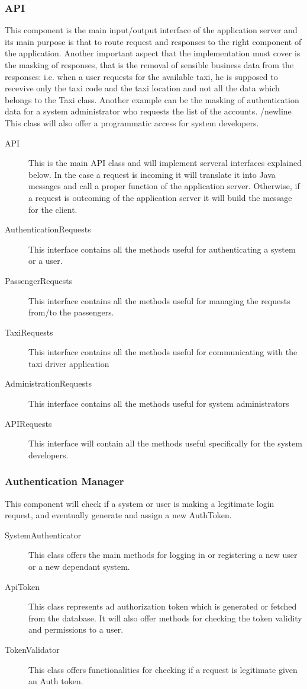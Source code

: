 \documentclass[11pt, a4paper,titlepage]{article}
\begin{document}
 \subsubsection{API}
	 This component is the main input/output interface of the application server and its main purpose is that to route request and responses to the right component of the application. Another important aspect that the implementation must cover is the masking of responses, that is the removal of sensible business data from the responses: i.e. when a user requests for the available taxi, he is supposed to recevive only the taxi code and the taxi location and not all the data which belongs to the Taxi class. Another example can be the masking of authentication data for a system administrator who requests the list of the accounts.
	 /newline This class will also offer a programmatic access for system developers. 
	 \begin{description}
	 	\item[API] This is the main API class and will implement serveral interfaces explained below. In the case a request is incoming it will translate it into Java messages and call a proper function of the application server. Otherwise, if a request is outcoming of the application server it will build the message for the client.
	 	\item[AuthenticationRequests] This interface contains all the methods useful for authenticating a system or a user.
	 	\item[PassengerRequests] This interface contains all the methods useful for managing the requests from/to the passengers. 
	 	\item[TaxiRequests] This interface contains all the methods useful for communicating with the taxi driver application
	 	\item[AdministrationRequests] This interface contains all the methods useful for system administrators
	 	\item[APIRequests] This interface will contain all the methods useful specifically for the system developers.
	 \end{description}
 \subsubsection{Authentication Manager}
	 This component will check if a system or user is making a legitimate login request, and eventually generate and assign a new AuthToken.
	 \begin{description}
	 	\item[SystemAuthenticator] This class offers the main methods for logging in or registering a new user or a new dependant system.
	 	\item[ApiToken] This class represents ad authorization token which is generated or fetched from the database. It will also offer methods for checking the token validity and permissions to a user.
	 	\item[TokenValidator] This class offers functionalities for checking if a request is legitimate given an Auth token.
	 \end{description}
\end{document}
